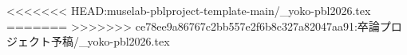 \documentclass[dvipdfmx,line_length=48zw,column_gap=2zw,number_of_lines=60,baselineskip=12pt]{jlreq}
\begin{document}





<<<<<<< HEAD:muselab-pblproject-template-main/_yoko-pbl2026.tex
=======
>>>>>>> ce78ee9a86767c2bb557e2f6b8c327a82047aa91:卒論プロジェクト予稿/_yoko-pbl2026.tex
\end{document}
